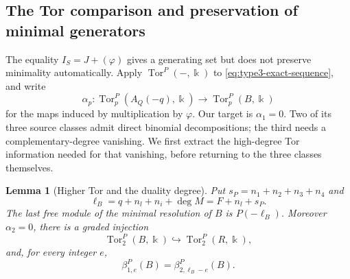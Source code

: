 \documentclass[10pt]{amsart}
\theoremstyle{plain}
\newtheorem{lemma}{Lemma}[section]
\begin{document}
\subsection{The Tor comparison and preservation of minimal generators}
\label{subsec:tor-comparison}

The equality \(I_S=J+(\varphi)\) gives a generating set but does not
preserve minimality automatically.  Apply \(\operatorname{Tor}^P(-,\Bbbk)\)
to \eqref{eq:type3-exact-sequence}, and write
\[
\alpha_p:\operatorname{Tor}_p^P(A_Q(-q),\Bbbk)
\longrightarrow\operatorname{Tor}_p^P(B,\Bbbk)
\]
for the maps induced by multiplication by \(\varphi\).
Our target is \(\alpha_1=0\).  Two of its three source classes admit
direct binomial decompositions; the third needs a complementary-degree
vanishing.  We first extract the high-degree Tor information needed for
that vanishing, before returning to the three classes themselves.

\begin{lemma}[Higher Tor and the duality degree]
\label{lem:type3-higher-tor}
Put \(s_P=n_1+n_2+n_3+n_4\) and
\[
\ell_B=q+n_l+n_i+\deg M=F+n_l+s_P.
\]
The last free module of the minimal resolution of \(B\) is
\(P(-\ell_B)\).  Moreover \(\alpha_2=0\), there is a graded injection
\begin{equation}\label{eq:type3-tor2-injection}
\operatorname{Tor}_2^P(B,\Bbbk)
\hookrightarrow\operatorname{Tor}_2^P(R,\Bbbk),
\end{equation}
and, for every integer \(e\),
\begin{equation}\label{eq:type3-duality}
\beta_{1,e}^P(B)=\beta_{2,\ell_B-e}^P(B).
\end{equation}
\end{lemma}
\end{document}

